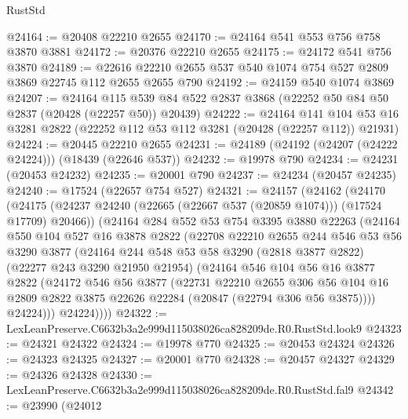 \begin{lexlean}{RustStd}
\begin{coremodule}
@24164 := @20408 @22210 @2655
@24170 := @24164 @541 @553 @756 @758 @3870 @3881
@24172 := @20376 @22210 @2655
@24175 := @24172 @541 @756 @3870
@24189 := @22616 @22210 @2655 @537 @540 @1074 @754 @527 @2809 @3869 @22745 @112 @2655 @2655 @790
@24192 := @24159 @540 @1074 @3869
@24207 := @24164
    @115
    @539
    @84
    @522
    @2837
    @3868
    (@22252 @50 @84 @50 @2837 (@20428 (@22257 @50)) @20439)
@24222 := @24164
    @141
    @104
    @53
    @16
    @3281
    @2822
    (@22252 @112 @53 @112 @3281 (@20428 (@22257 @112)) @21931)
@24224 := @20445 @22210 @2655
@24231 := @24189 (@24192 (@24207 (@24222 @24224))) (@18439 (@22646 @537))
@24232 := @19978 @790
@24234 := @24231 (@20453 @24232)
@24235 := @20001 @790
@24237 := @24234 (@20457 @24235)
@24240 := @17524 (@22657 @754 @527)
@24321 := @24157
    (@24162
      (@24170
        (@24175 (@24237 @24240 (@22665 (@22667 @537 (@20859 @1074))) (@17524 @17709) @20466))
        (@24164
          @284
          @552
          @53
          @754
          @3395
          @3880
          @22263
          (@24164
            @550
            @104
            @527
            @16
            @3878
            @2822
            (@22708
              @22210
              @2655
              @244
              @546
              @53
              @56
              @3290
              @3877
              (@24164
                @244
                @548
                @53
                @58
                @3290
                (@2818 @3877 @2822)
                (@22277 @243 @3290 @21950 @21954)
                (@24164
                  @546
                  @104
                  @56
                  @16
                  @3877
                  @2822
                  (@24172
                    @546
                    @56
                    @3877
                    (@22731
                      @22210
                      @2655
                      @306
                      @56
                      @104
                      @16
                      @2809
                      @2822
                      @3875
                      @22626
                      @22284
                      (@20847 (@22794 @306 @56 @3875))))
                  @24224)))
            @24224))))
@24322 := LexLeanPreserve.C6632b3a2e999d115038026ca828209de.R0.RustStd.look9
@24323 := @24321 @24322
@24324 := @19978 @770
@24325 := @20453 @24324
@24326 := @24323 @24325
@24327 := @20001 @770
@24328 := @20457 @24327
@24329 := @24326 @24328
@24330 := LexLeanPreserve.C6632b3a2e999d115038026ca828209de.R0.RustStd.fal9
@24342 := @23990
    (@24012

\end{coremodule}
\end{lexlean}
